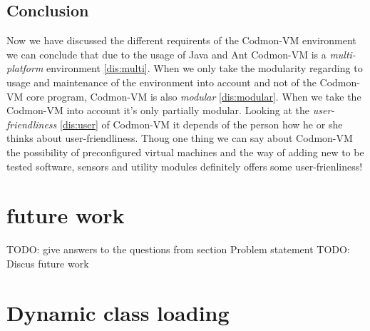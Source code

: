 \documentclass{article}
\newcommand{\project}{Codmon-VM}
\begin{document}
\subsection{Conclusion}
Now we have discussed the different requirents of the \project{} environment we can conclude that due to the usage of Java and Ant \project{} is a \emph{multi-platform} environment \ref{dis:multi}. When we only take the 
modularity regarding to usage and maintenance of the environment into account and not of the \project{} core program, \project{} is also \emph{modular} \ref{dis:modular}. When we take the \project{} into account it's 
only partially modular. Looking at the \emph{user-friendliness} \ref{dis:user} of \project{} it depends of the person how he or she thinks about user-friendliness. Thoug one thing we can say about \project{} 
the possibility of preconfigured virtual machines and the way of adding new to be tested software, sensors and utility modules definitely offers some user-frienliness!


\newpage
\section{future work}
\label{sec:conclusion}
TODO: give answers to the questions from section Problem statement
TODO: Discus future work
\newpage


\newpage
\appendix
\section{Dynamic class loading}
\label{AppendixA}
\end{document}
